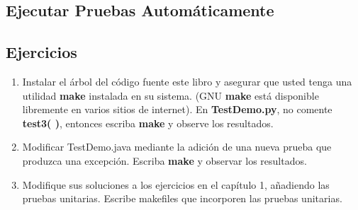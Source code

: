 \newpage

\subsection*{Ejecutar Pruebas Automáticamente}
\label{subsec:epa}


\subsection*{Ejercicios}
\label{subsec:ex}

\begin{enumerate}
    
    \item Instalar el árbol del código fuente este libro y asegurar que usted tenga una utilidad \textbf{make} instalada en su sistema. (GNU \textbf{make} está disponible libremente en varios sitios de internet). En \textbf{TestDemo.py}, no comente \textbf{test3( )}, entonces escriba \textbf{make} y observe los resultados.
    
    \item Modificar TestDemo.java mediante la adición de una nueva prueba que produzca una excepción. Escriba \textbf{make} y observar los resultados.
    
    \item Modifique sus soluciones a los ejercicios en el capítulo 1, añadiendo las pruebas unitarias. Escribe makefiles que incorporen las pruebas unitarias.
    
\end{enumerate}

            